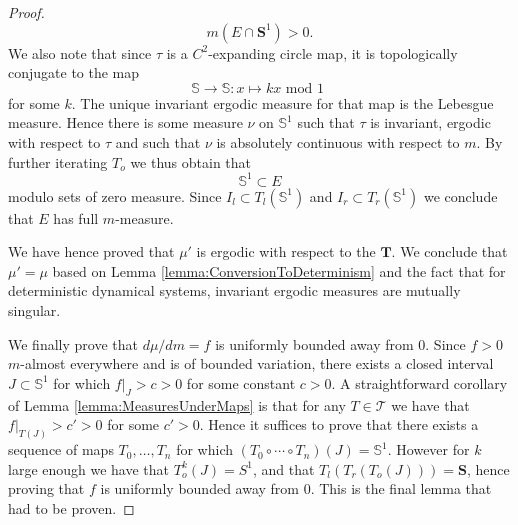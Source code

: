 \documentclass[pdftex,11pt,a4paper,oneside]{article}
\theoremstyle{plain}
\newcommand{\rstr}[2]{\left. #1 \right\rvert_{#2}}
\begin{document}
\begin{proof}
 \[m(E\cap \mathbf{S}^1)>0.\]
 We also note that since $\tau$ is a $C^2$-expanding circle map, it is topologically conjugate to the map \[\mathbb{S}\to\mathbb{S}:x\mapsto kx \text{ mod 1 }\] for some $k$. The unique invariant ergodic measure for that map is the Lebesgue measure. Hence there is some measure $\nu$ on $\mathbb{S}^1$ such that $\tau$ is invariant, ergodic with respect to $\tau$ and such that $\nu$ is absolutely continuous with respect to $m$. By further iterating $T_{o}$ we thus obtain that 
 \[\mathbb{S}^1\subset E\]
 modulo sets of zero measure. Since $I_l\subset T_l(\mathbb{S}^1)$ and $I_r\subset T_r(\mathbb{S}^1)$ we conclude that $E$ has full $m$-measure.
 
 We have hence proved that $\mu'$ is ergodic with respect to the $\mathbf{T}$. We conclude that $\mu' = \mu$ based on Lemma \ref{lemma:ConversionToDeterminism} and the fact that for deterministic dynamical systems, invariant ergodic measures are mutually singular. 
 
We finally prove that $d\mu/dm = f$ is uniformly bounded away from $0$. Since $f>0$ $m$-almost everywhere and is of bounded variation, there exists a closed interval $J\subset \mathbb{S}^1$ for which $\rstr{f}{J}>c>0$ for some constant $c>0$. A straightforward corollary of Lemma \ref{lemma:MeasuresUnderMaps} is that for any $T\in\mathcal{T}$ we have that $\rstr{f}{T(J)}>c'>0$ for some $c'>0$. Hence it suffices to prove that there exists a sequence of maps $T_0,\ldots,T_n$ for which  $(T_0\circ\cdots\circ T_n)(J) = \mathbb{S}^1$. However for $k$ large enough we have that $T_{o}^k(J) = S^1$, and that $T_l(T_r(T_{o}(J))) = \mathbf{S}$, hence proving that $f$ is uniformly bounded away from $0$. This is the final lemma that had to be proven.
\end{proof}
\end{document}
